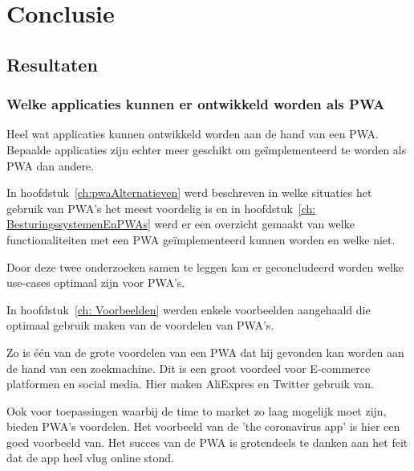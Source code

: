 \chapter{Conclusie}
\label{ch:conclusie}

	  

\section{Resultaten}

	\subsection{Welke applicaties kunnen er ontwikkeld worden als PWA}
	
		Heel wat applicaties kunnen ontwikkeld worden aan de hand van een PWA. Bepaalde applicaties zijn echter meer geschikt om geïmplementeerd te worden als PWA dan andere.
		
		In hoofdstuk~\ref{ch:pwaAlternatieven} werd beschreven in welke situaties het gebruik van PWA's het meest voordelig is en in hoofdstuk~\ref{ch: BesturingssystemenEnPWAs} werd er een overzicht gemaakt van welke functionaliteiten met een PWA geïmplementeerd kunnen worden en welke niet.
		
		Door deze twee onderzoeken samen te leggen kan er geconcludeerd worden welke use-cases optimaal zijn voor PWA's.
		
		In hoofdstuk~\ref{ch: Voorbeelden} werden enkele voorbeelden aangehaald die optimaal gebruik maken van de voordelen van PWA's.
			
		Zo is één van de grote voordelen van een PWA dat hij gevonden kan worden aan de hand van een zoekmachine. Dit is een groot voordeel voor E-commerce platformen en social media. Hier maken AliExpres en Twitter gebruik van.
		
		Ook voor toepassingen waarbij de time to market zo laag mogelijk moet zijn, bieden PWA's voordelen. Het voorbeeld van de 'the coronavirus app' is hier een goed voorbeeld van. Het succes van de PWA is grotendeels te danken aan het feit dat de app heel vlug online stond.

